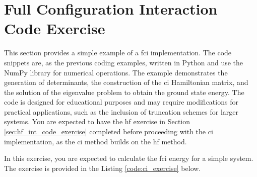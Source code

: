 \section{Full Configuration Interaction Code Exercise}

This section provides a simple example of a \acrshort{fci} implementation. The code snippets are, as the previous coding examples, written in Python and use the NumPy library for numerical operations. The example demonstrates the generation of determinants, the construction of the \acrshort{ci} Hamiltonian matrix, and the solution of the eigenvalue problem to obtain the ground state energy. The code is designed for educational purposes and may require modifications for practical applications, such as the inclusion of truncation schemes for larger systems. You are expected to have the \acrshort{hf} exercise in Section \ref{sec:hf_int_code_exercise} completed before proceeding with the \acrshort{ci} implementation, as the \acrshort{ci} method builds on the \acrshort{hf} method.

In this exercise, you are expected to calculate the \acrshort{fci} energy for a simple system. The exercise is provided in the Listing \ref{code:ci_exercise} below.

